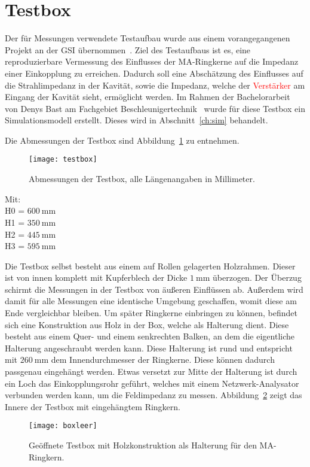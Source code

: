 \section{Testbox}
\label{sec:testbox}
Der f\"ur Messungen verwendete Testaufbau wurde aus einem vorangegangenen Projekt an der GSI \"ubernommen~\citep{harzheim2016modeling}. Ziel des Testaufbaus ist es, eine reproduzierbare Vermessung des Einflusses der MA-Ringkerne auf die Impedanz einer Einkopplung zu erreichen. Dadurch soll eine Absch\"atzung des Einflusses auf die Strahlimpedanz in der Kavit\"at, sowie die Impedanz, welche der \textcolor{red}{Verst\"arker} am Eingang der Kavit\"at sieht, erm\"oglicht werden. Im Rahmen der Bachelorarbeit von Denys Bast am Fachgebiet Beschleunigertechnik~\citep{bast2017ba} wurde f\"ur diese Testbox ein Simulationsmodell erstellt. Dieses wird in Abschnitt~\ref{ch:sim} behandelt.

\par
Die Abmessungen der Testbox sind Abbildung~\ref{fig:boxdimensions} zu entnehmen.
\par
\begin{figure}[htb]
	\centering
	\texttt{[image: testbox]}
	\caption{Abmessungen der Testbox, alle L\"angenangaben in Millimeter.}
	\label{fig:boxdimensions}
\end{figure}
Mit:\\
H0 = $\SI{600}{\milli\meter}$\\
H1 = $\SI{350}{\milli\meter}$\\
H2 = $\SI{445}{\milli\meter}$\\
H3 = $\SI{595}{\milli\meter}$

Die Testbox selbst besteht aus einem auf Rollen gelagerten Holzrahmen. Dieser ist von innen komplett mit Kupferblech der Dicke $\SI{1}{\milli\meter}$ \"uberzogen. Der Überzug schirmt die Messungen in der Testbox von \"au\ss{}eren Einfl\"ussen ab. Au\ss{}erdem wird damit f\"ur alle Messungen eine identische Umgebung geschaffen, womit diese am Ende vergleichbar bleiben. Um sp\"ater Ringkerne einbringen zu k\"onnen, befindet sich eine Konstruktion aus Holz in der Box, welche als Halterung dient. Diese besteht aus einem Quer- und einem senkrechten Balken, an dem die eigentliche Halterung angeschraubt werden kann. Diese Halterung ist rund und entspricht mit $\SI{260}{\milli\meter}$ dem Innendurchmesser der Ringkerne. Diese k\"onnen dadurch passgenau eingeh\"angt werden. Etwas versetzt zur Mitte der Halterung ist durch ein Loch das Einkopplungsrohr gef\"uhrt, welches mit einem Netzwerk-Analysator verbunden werden kann, um die Feldimpedanz zu messen. Abbildung~\ref{fig:leereBox} zeigt das Innere der Testbox mit eingeh\"angtem Ringkern. 
\par
\begin{figure}[htb]
	\centering
	\texttt{[image: boxleer]}
	\caption{Ge\"offnete Testbox mit Holzkonstruktion als Halterung f\"ur den MA-Ringkern.}
	\label{fig:leereBox}
\end{figure}


